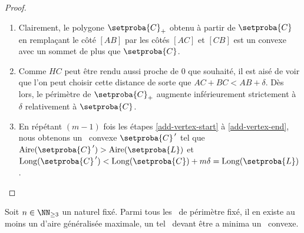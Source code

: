 \begin{proof}
\begin{enumerate}
		\item Clairement, le polygone $\setproba{C}_+$ obtenu à partir de $\setproba{C}$ en remplaçant le côté $[AB]$ par les côtés $[AC]$ et $[CB]$ est un convexe avec un sommet de plus que $\setproba{C}$.

		\item \label{add-vertex-end}
		Comme $HC$ peut être rendu aussi proche de $0$ que souhaité, il est aisé de voir que l'on peut choisir cette distance de sorte que $AC + BC < AB + \delta$.
		Dès lors, le périmètre de $\setproba{C}_+$ augmente inférieurement strictement à $\delta$ relativement à $\setproba{C}$.

		\item En répétant $(m-1)$ fois les étapes \ref{add-vertex-start} à \ref{add-vertex-end}, nous obtenons un \ngone\ convexe $\setproba{C}^{\,\prime}$ tel que
		$\area{\setproba{C}^{\,\prime}} > \area{\setproba{L}}$
		et
		$\perim{\setproba{C}^{\,\prime}} < \perim{\setproba{C}} + m \delta = \perim{\setproba{L}}$.
	\end{enumerate}
\end{proof}




\begin{fact} \label{suff-cond}
    Soit $n \in \NN_{\geq3}$ un naturel fixé.
    Parmi tous les \ncycles\ de périmètre fixé, il en existe au moins un d'aire généralisée maximale, un tel \ncycle\ devant être a minima un \ngone\ convexe.
\end{fact}


